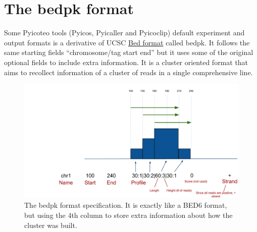 \documentclass[letterpaper,10pt,english]{sphinxmanual}
\begin{document}
\section{The bedpk format}
\label{index:the-bedpk-format}
Some Pyicoteo tools (Pyicos, Pyicaller and Pyicoclip) default experiment and output formats is a derivative of UCSC \href{http://genome.ucsc.edu/FAQ/FAQformat.html\#format1}{Bed format} called bedpk. It follows the same starting fields ``chromosome/tag start end'' but it uses some of the original optional fields to include extra information. It is a cluster oriented format that aims to recollect information of a cluster of reads in a single comprehensive line.
\begin{figure}[htbp]
\centering
\capstart

\includegraphics[width=50em]{bedpk_format.svg.png}
\caption{The bedpk format specification. It is exactly like a BED6 format, but using the 4th column to store extra information about how the cluster was built.}\end{figure}
\end{document}
